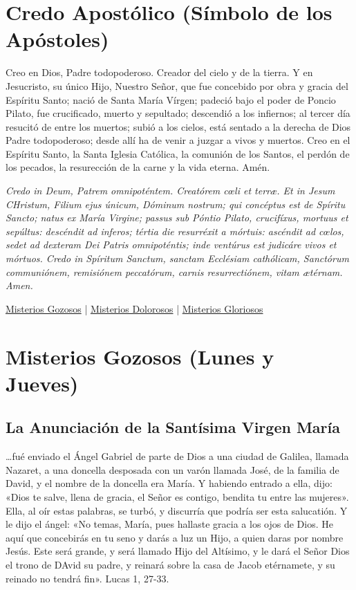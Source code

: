\documentclass[a4paper,11pt, oneside]{report}
\begin{document}
\section*{Credo Apostólico (Símbolo de los Apóstoles)}

Creo en Dios, Padre todopoderoso. Creador del cielo y de la tierra. Y en Jesucristo, su único Hijo, Nuestro Señor, que fue concebido por
obra y gracia del Espíritu Santo; nació de Santa María Vírgen; padeció bajo el poder de Poncio Pilato, fue crucificado, muerto y sepultado;
descendió a los infiernos; al tercer día resucitó de entre los muertos; subió a los cielos, está sentado a la derecha de Dios Padre todopoderoso;
desde allí ha de venir a juzgar a vivos y muertos. Creo en el Espíritu Santo, la Santa Iglesia Católica, la comunión de los Santos, el perdón
de los pecados, la resurección de la carne y la vida eterna. Amén.

\medskip

\textit{Credo in Deum, Patrem omnipoténtem. Creatórem c{\oe}li et terr{\ae}. Et in Jesum CHristum, Filium ejus únicum, Dóminum nostrum; qui concéptus
est de Spíritu Sancto; natus ex María Virgine; passus sub Póntio Pilato, crucifíxus, mortuus et sepúltus: descéndit ad inferos; tértia die resurréxit
a mórtuis: ascéndit ad c{\oe}los, sedet ad dexteram Dei Patris omnipoténtis; inde ventúrus est judicáre vivos et mórtuos. Credo in Spíritum Sanctum,
sanctam Ecclésiam cathólicam, Sanctórum communiónem, remisiónem peccatórum, carnis resurrectiónem, vitam {\ae}térnam. Amen.}

\bigskip

\begin{center}
  \hyperlink{sec:gozosos}{Misterios Gozosos} | \hyperlink{sec:dolorosos}{Misterios Dolorosos} | \hyperlink{sec:gloriosos}{Misterios Gloriosos}
\end{center}
    

\section*{Misterios Gozosos (Lunes y Jueves)}\label{sec:gozosos}

\subsection*{La Anunciación de la Santísima Virgen María}
  
{\ldots}fué enviado el Ángel Gabriel de parte de Dios a una ciudad de Galilea, llamada Nazaret, a una doncella desposada con un varón llamada José, 
de la familia de David, y el nombre de la doncella era María. Y habiendo entrado a ella, dijo: «Dios te salve, llena de gracia, el Señor es contigo, 
bendita tu entre las mujeres». Ella, al oír estas palabras, se turbó, y discurría que podría ser esta salucatión. 
Y le dijo el ángel: «No temas, María, pues hallaste gracia a los ojos de Dios. He aquí que concebirás en tu seno y darás a luz un Hijo, a quien 
daras por nombre Jesús. Este será grande, y será llamado Hijo del Altísimo, y le dará el Señor Dios el trono de DAvid su padre, y reinará sobre 
la casa de Jacob etérnamete, y su reinado no tendrá fin». Lucas 1, 27-33.
    
\end{document}
